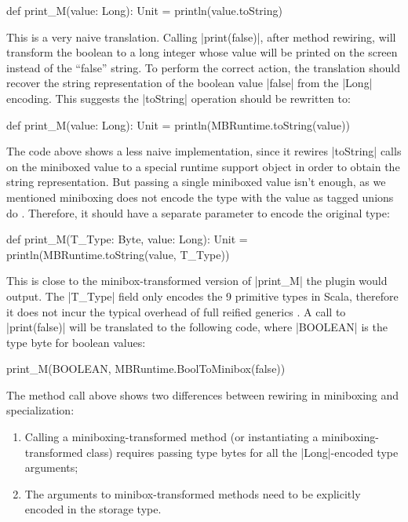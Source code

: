 \begin{lstlisting-nobreak}
 def print_M(value: Long): Unit = println(value.toString)
\end{lstlisting-nobreak}

This is a very naive translation. Calling |print(false)|, after method rewiring, will transform the boolean to a long integer whose value will be printed on the screen instead of the ``false'' string. To perform the correct action, the translation should recover the string representation of the boolean value |false| from the |Long| encoding. This suggests the |toString| operation should be rewritten to:

\begin{lstlisting-nobreak}
 def print_M(value: Long): Unit = println(MBRuntime.toString(value))
\end{lstlisting-nobreak}

The code above shows a less naive implementation, since it rewires |toString| calls on the miniboxed value to a special runtime support object in order to obtain the string representation. But passing a single miniboxed value isn't enough, as we mentioned miniboxing does not encode the type with the value as tagged unions do \cite{tagged-unions-lua}. Therefore, it should have a separate parameter to encode the original type:

\begin{lstlisting-nobreak}
 def print_M(T_Type: Byte, value: Long): Unit = println(MBRuntime.toString(value, T_Type))
\end{lstlisting-nobreak}

This is close to the minibox-transformed version of |print_M| the plugin would output. The |T_Type| field only encodes the 9 primitive types in Scala, therefore it does not incur the typical overhead of full reified generics \cite{michel-thesis}. A call to |print(false)| will be translated to the following code, where |BOOLEAN| is the type byte for boolean values:

\begin{lstlisting-nobreak}
 print_M(BOOLEAN, MBRuntime.BoolToMinibox(false))
\end{lstlisting-nobreak}

The method call above shows two differences between rewiring in miniboxing and specialization:
\begin{enumerate}
  \item Calling a miniboxing-transformed method (or instantiating a miniboxing-transformed class) requires passing type bytes for all the |Long|-encoded type arguments;
  \item The arguments to minibox-transformed methods need to be explicitly encoded in the storage type.
\end{enumerate}

